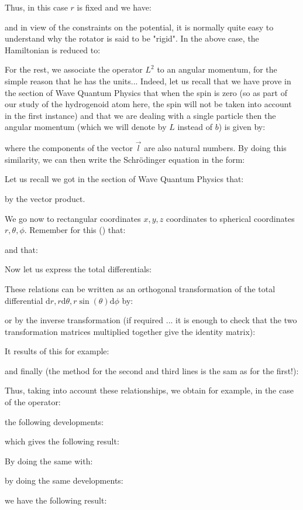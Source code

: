 	Thus, in this case $r$ is fixed and we have:
	
	and in view of the constraints on the potential, it is normally quite easy to understand why the rotator is said to be "rigid". In the above case, the Hamiltonian is reduced to:
	
	
	For the rest, we associate the operator $L^2$ to an angular momentum, for the simple reason that he has the units... Indeed, let us recall that we have prove in the section of Wave Quantum Physics that when the spin is zero (so as part of our study of the hydrogenoid  atom here, the spin will not be taken into account in the first instance) and that we are dealing with a single particle then the angular momentum (which we will denote by $L$ instead of $b$) is given by:
	
	where the components of the vector $\vec{l}$ are also natural numbers. By doing this similarity, we can then write the Schrödinger equation in the form:
	
	Let us recall we got in the section of Wave Quantum Physics that:
	
	by the vector product.
	
	We go now to rectangular coordinates $x, y, z$ coordinates to spherical coordinates $r,\theta,\phi$. Remember for this () that:
	
	and that:
	
	Now let us express the total differentials:
	
	These relations can be written as an orthogonal transformation of the total differential $\mathrm{d}r,r\mathrm{d}\theta,r\sin(\theta)\mathrm{d}\phi$ by:
	
	or by the inverse transformation (if required ... it is enough to check that the two transformation matrices multiplied together give the identity matrix):
	
	It results of this for example:
	
	and finally (the method for the second and third lines is the sam as for the first!):
	
	Thus, taking into account these relationships, we obtain for example, in the case of the operator:
	
	the following developments:
	
	which gives the following result:
	
	By doing the same with:
	
	by doing the same developments:
	
	we have the following result:
	
